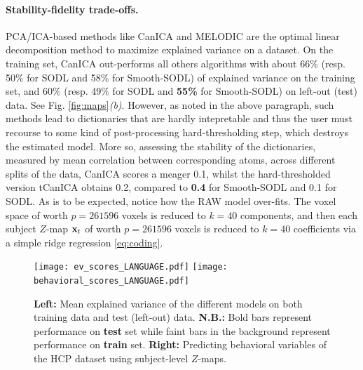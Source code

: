 \paragraph{Stability-fidelity trade-offs.}
PCA/ICA-based methods like CanICA  \cite{varoquaux2010group} and MELODIC  \cite{smith2004advances} are the optimal linear decomposition method to maximize
explained variance on a dataset. On the training set,  CanICA  \cite{varoquaux2010group} out-performs all
others algorithms with about 66\% (resp. 50\% for SODL \cite{mairal2010} and 58\% for Smooth-SODL) of explained variance on the training set, and 60\% (resp. 49\% for SODL and \textbf{55\%} for Smooth-SODL) on left-out (test) data. See Fig. \ref{fig:maps}\textit{(b)}. However, as noted in the above paragraph, such methods lead to dictionaries that are hardly intepretable and thus the user must
recourse to some kind of post-processing hard-thresholding step, which destroys the estimated model. More so,
assessing the stability of the dictionaries, measured by mean correlation between corresponding atoms, across different splits of the data, CanICA  \cite{varoquaux2010group} scores a meager 0.1, whilst the hard-thresholded version tCanICA obtains 0.2, compared to \textbf{0.4} for Smooth-SODL and 0.1 for SODL.   As is to be expected, notice how the RAW model over-fits.
The voxel space of worth $p=261596$ voxels is reduced to $k=40$ components, and then each subject $Z$-map $\mathbf{x}_t$ of worth $p=261596$ voxels is reduced to $k=40$ coefficients via a simple ridge regression \eqref{eq:coding}.

 \begin{figure}[!htpb]
   \texttt{[image: ev\_scores\_LANGUAGE.pdf]}
   \texttt{[image: behavioral\_scores\_LANGUAGE.pdf]}  

   \caption{\textbf{Left:} Mean explained variance of the different models on both training data and test (left-out) data. \textbf{N.B.:} Bold bars represent performance on \textbf{test} set while faint bars in the 
  background represent performance on \textbf{train} set. 
  \textbf{Right:} Predicting  behavioral  variables of the HCP \cite{VanEssen20122222} dataset using subject-level $Z$-maps.
  }
  \end{figure}


